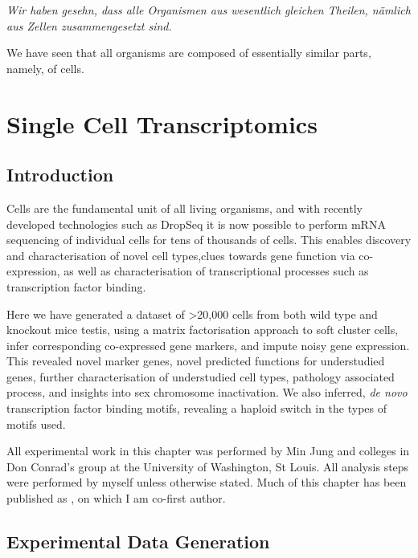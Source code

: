 \begin{savequote}[8cm]
	\textit{Wir haben gesehn, dass alle Organismen aus wesentlich gleichen Theilen, nämlich aus Zellen zusammengesetzt sind.}
	
	We have seen that all organisms are composed of essentially similar parts, namely, of cells.
\end{savequote}

\chapter{\label{ch:2-SDA} Single Cell Transcriptomics}

\minitoc

\section{Introduction}
Cells are the fundamental unit of all living organisms, and with recently developed technologies such as DropSeq it is now possible to perform mRNA sequencing of individual cells for tens of thousands of cells. This enables discovery and characterisation of novel cell types,clues towards gene function via co-expression, as well as characterisation of transcriptional processes such as transcription factor binding.

Here we have generated a dataset of >20,000 cells from both wild type and knockout mice testis, using a matrix factorisation approach to soft cluster cells, infer corresponding co-expressed gene markers, and impute noisy gene expression. This revealed novel marker genes, novel predicted functions for understudied genes, further characterisation of understudied cell types, pathology associated process, and insights into sex chromosome inactivation. We also inferred, \emph{de novo} transcription factor binding motifs, revealing a haploid switch in the types of motifs used.

\vspace{0.7cm}
\begin{framed}
\noindent All experimental work in this chapter was performed by Min Jung and colleges in Don Conrad's group at the University of Washington, St Louis. All analysis steps were performed by myself unless otherwise stated. Much of this chapter has been published as \cite{Jung2019Unified}, on which I am co-first author.
\end{framed}

\section{Experimental Data Generation}

